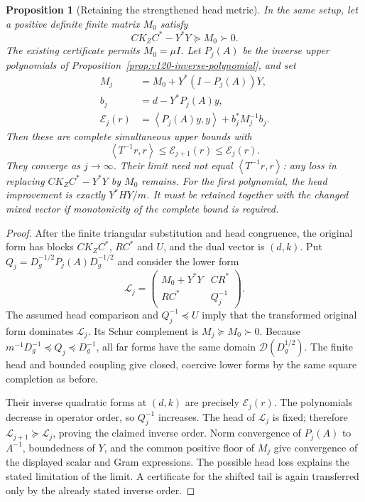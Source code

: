 \documentclass[11pt]{article}
\newtheorem{proposition}[theorem]{Proposition}
\theoremstyle{remark}
\newcommand{\ip}[2]{\left\langle #1,#2\right\rangle}
\begin{document}
\begin{proposition}[Retaining the strengthened head metric]
\label{prop:v123-monotone-head}
In the same setup, let a positive definite finite matrix $M_0$
satisfy
\[
 C K_Z C^*-Y^*Y\succeq M_0\succ0.
\]
The existing certificate permits $M_0=\mu I$. Let $P_j(A)$
be the inverse upper polynomials of
Proposition~\ref{prop:v120-inverse-polynomial}, and set
\begin{align*}
 M_j&=M_0+Y^*(I-P_j(A))Y,\\
 b_j&=d-Y^*P_j(A)y,\\
 \mathcal E_j(r)&=\ip{P_j(A)y}{y}+b_j^*M_j^{-1}b_j.
\end{align*}
Then these are complete simultaneous upper bounds with
\begin{equation}\label{eq:v123-monotone-head}
 \ip{T^{-1}r}{r}\le\mathcal E_{j+1}(r)
          \le\mathcal E_j(r).
\end{equation}
They converge as $j\to\infty$. Their limit need not equal
$\ip{T^{-1}r}{r}$: any loss in replacing
$CK_ZC^*-Y^*Y$ by $M_0$ remains.
For the first polynomial, the head improvement is exactly
$Y^*HY/m$. It must be retained together with the changed
mixed vector if monotonicity of the complete bound is required.
\end{proposition}
\begin{proof}
After the finite triangular substitution and head congruence,
the original form has blocks $CK_ZC^*$, $RC^*$ and $U$,
and the dual vector is $(d,k)$. Put
$Q_j=D_g^{-1/2}P_j(A)D_g^{-1/2}$ and consider the lower form
\[
 \mathcal L_j=
 \begin{pmatrix}
 M_0+Y^*Y & CR^*\\
 RC^* & Q_j^{-1}
 \end{pmatrix}.
\]
The assumed head comparison and $Q_j^{-1}\preceq U$ imply
that the transformed original form dominates $\mathcal L_j$.
Its Schur complement is $M_j\succeq M_0\succ0$.
Because $m^{-1}D_g^{-1}\preceq Q_j\preceq D_g^{-1}$,
all far forms have the same domain $\mathcal D(D_g^{1/2})$.
The finite head and bounded coupling give closed, coercive
lower forms by the same square completion as before.

Their inverse quadratic forms at $(d,k)$ are precisely
$\mathcal E_j(r)$. The polynomials decrease in operator order,
so $Q_j^{-1}$ increases. The head of $\mathcal L_j$ is fixed;
therefore $\mathcal L_{j+1}\succeq\mathcal L_j$, proving the
claimed inverse order. Norm convergence of $P_j(A)$ to $A^{-1}$,
boundedness of $Y$, and the common positive floor of $M_j$
give convergence of the displayed scalar and Gram expressions.
The possible head loss explains the stated limitation of the
limit. A certificate for the shifted tail is again transferred
only by the already stated inverse order.
\end{proof}
\end{document}
